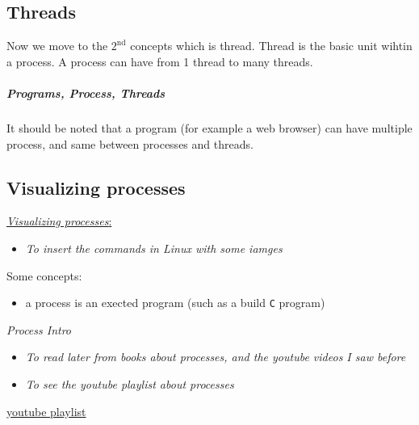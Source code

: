 \documentclass[12pt,a4paper]{book}
\begin{document}
\subsection{Threads}


Now we move to the $\mathrm{2}^\mathrm{nd}$ concepts which is thread. Thread is the basic unit wihtin a process. A process can have from 1 thread to many threads.


\subparagraph{Programs, Process, Threads}

It should be noted that a program (for example a web browser) can have multiple process, and same between processes and threads.

\subsection{Visualizing processes}

 \underline{\textit{Visualizing processes}:}

\begin{itemize}

\item \textit{To insert the commands in Linux with some iamges}

\end{itemize}



Some concepts:

\begin{itemize}

\item a process is an exected program (such as a build \verb|C| program)

\end{itemize}

 \textit{Process Intro}

\begin{itemize}

\item \textit{To read later from books about processes, and the youtube videos I saw before}

\item \textit{To see the youtube playlist about processes}

\end{itemize}

\underline{youtube playlist}
\end{document}
